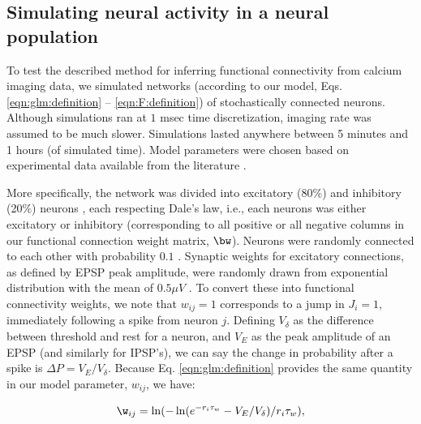 \subsection{Simulating neural activity in a neural population} \label{sec:results:simulations}

To test the described method for inferring functional connectivity from calcium imaging data, we simulated networks (according to our model, Eqs. \ref{eqn:glm:definition} -- \ref{eqn:F:definition}) of stochastically connected neurons.  Although simulations ran at $1$ msec time discretization, imaging rate was assumed to be much slower. Simulations lasted anywhere between 5 minutes and 1 hours (of simulated time).  Model parameters were chosen based on experimental data available from the literature \cite{Braitenberg1998, Urquijo2000, Lefort2009, Sayer1990}.  

More specifically, the network was divided into excitatory (80\%) and inhibitory (20\%) neurons \cite{Braitenberg1998, Urquijo2000}, each respecting Dale's law, i.e., each neurons was either excitatory or inhibitory (corresponding to all positive or all negative columns in our functional connection weight matrix, $\bw$). Neurons were randomly connected to each other with probability $0.1$ \cite{Braitenberg1998, Lefort2009}.  Synaptic weights for excitatory connections, as defined by EPSP peak amplitude, were randomly drawn from exponential distribution with the mean of $0.5 \mu V$ \cite{Lefort2009, Sayer1990}. To convert these into functional connectivity weights, we note that $w_{ij}=1$ corresponds to a jump in $J_i=1$, immediately following a spike from neuron $j$.  Defining $V_\delta$ as the difference between threshold and rest for a neuron, and $V_E$ as the peak amplitude of an EPSP (and similarly for IPSP's), we can say the change in probability after a spike is $\Delta P=V_E/V_\delta$. Because Eq. \ref{eqn:glm:definition} provides the same quantity in our model parameter, $w_{ij}$, we have:

\begin{equation}\label{eqn:convert}
\w_{ij}=\ln(-\ln(e^{-r_i\tau_w}-V_E/V_{\delta})/r_i\tau_w),
\end{equation}

